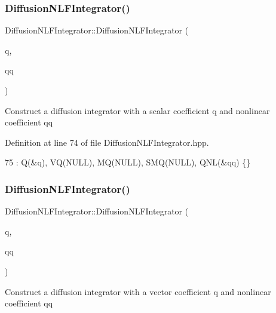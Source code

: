\subsubsection{\texorpdfstring{Diffusion\+N\+L\+F\+Integrator()}{DiffusionNLFIntegrator()}\hspace{0.1cm}{\footnotesize\ttfamily [2/5]}}
{\footnotesize\ttfamily Diffusion\+N\+L\+F\+Integrator\+::\+Diffusion\+N\+L\+F\+Integrator (\begin{DoxyParamCaption}\item[{mfem\+::\+Constant\+Coefficient \&}]{q,  }\item[{\hyperlink{classNonlinearCoefficient}{Nonlinear\+Coefficient} \&}]{qq }\end{DoxyParamCaption})\hspace{0.3cm}{\ttfamily [inline]}}

Construct a diffusion integrator with a scalar coefficient q and nonlinear coefficient qq 

Definition at line 74 of file Diffusion\+N\+L\+F\+Integrator.\+hpp.


\begin{DoxyCode}
75       : Q(&q), VQ(NULL), MQ(NULL), SMQ(NULL), QNL(&qq) \{\}
\end{DoxyCode}
\mbox{\label{classDiffusionNLFIntegrator_a8ac2d40eeb337b5e583af9aa507b3f79}} 
\subsubsection{\texorpdfstring{Diffusion\+N\+L\+F\+Integrator()}{DiffusionNLFIntegrator()}\hspace{0.1cm}{\footnotesize\ttfamily [3/5]}}
{\footnotesize\ttfamily Diffusion\+N\+L\+F\+Integrator\+::\+Diffusion\+N\+L\+F\+Integrator (\begin{DoxyParamCaption}\item[{mfem\+::\+Vector\+Coefficient \&}]{q,  }\item[{\hyperlink{classNonlinearCoefficient}{Nonlinear\+Coefficient} \&}]{qq }\end{DoxyParamCaption})\hspace{0.3cm}{\ttfamily [inline]}}

Construct a diffusion integrator with a vector coefficient q and nonlinear coefficient qq 

